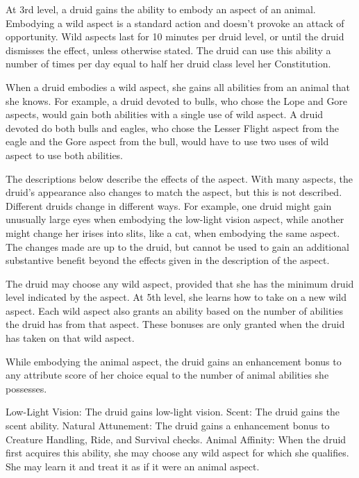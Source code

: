  At 3rd level, a druid gains the ability to embody an aspect of an animal. Embodying a wild aspect is a standard action and doesn't provoke an attack of opportunity. Wild aspects last for 10 minutes per druid level, or until the druid dismisses the effect, unless otherwise stated. The druid can use this ability a number of times per day equal to half her druid class level \add her Constitution.
\par When a druid embodies a wild aspect, she gains all abilities from an animal that she knows. For example, a druid devoted to bulls, who chose the Lope and Gore aspects, would gain both abilities with a single use of wild aspect. A druid devoted do both bulls and eagles, who chose the Lesser Flight aspect from the eagle and the Gore aspect from the bull, would have to use two uses of wild aspect to use both abilities.
\par The descriptions below describe the effects of the aspect. With many aspects, the druid's appearance also changes to match the aspect, but this is not described. Different druids change in different ways. For example, one druid might gain unusually large eyes when embodying the low-light vision aspect, while another might change her irises into slits, like a cat, when embodying the same aspect. The changes made are up to the druid, but cannot be used to gain an additional substantive benefit beyond the effects given in the description of the aspect.
\par The druid may choose any wild aspect, provided that she has the minimum druid level indicated by the aspect. At 5th level, she learns how to take on a new wild aspect. Each wild aspect also grants an ability based on the number of abilities the druid has from that aspect. These bonuses are only granted when the druid has taken on that wild aspect.

While embodying the animal aspect, the druid gains an enhancement bonus to any attribute score of her choice equal to the number of animal abilities she possesses.
\begin{wildaspect}
\wilditem Low-Light Vision: The druid gains low-light vision.
\wilditem Scent: The druid gains the scent ability.
\wilditem Natural Attunement: The druid gains a  enhancement bonus to Creature Handling, Ride, and Survival checks.
\wilditem Animal Affinity: When the druid first acquires this ability, she may choose any wild aspect for which she qualifies. She may learn it and treat it as if it were an animal aspect.
\end{wildaspect}

